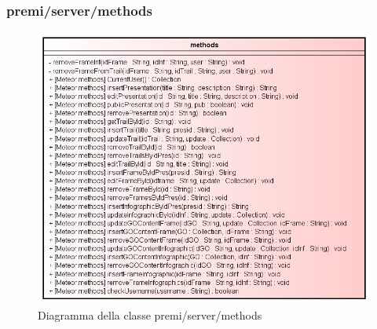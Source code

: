 \subsubsection{premi/server/methods}
\begin{figure}[H]
\begin{center}
\includegraphics[scale=0.55]{img/diacla/methods.png}
\caption{Diagramma della classe premi/server/methods}
\end{center}
\end{figure}




